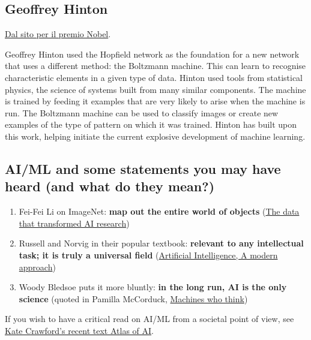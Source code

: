 \documentclass[%
oneside,                 %
final,                   %
10pt]{article}
\begin{document}
\subsection{Geoffrey Hinton}

\href{{https://www.nobelprize.org/prizes/physics/2024/press-release/#:~:text=Geoffrey%20Hinton%20invented%20a%20method,learning%20using%20artificial%20neural%20networks}}{Dal sito per il premio Nobel}.
\begin{block}{}
Geoffrey Hinton used the Hopfield network as the foundation for a new
network that uses a different method: the Boltzmann machine. This can
learn to recognise characteristic elements in a given type of
data. Hinton used tools from statistical physics, the science of
systems built from many similar components. The machine is trained by
feeding it examples that are very likely to arise when the machine is
run. The Boltzmann machine can be used to classify images or create
new examples of the type of pattern on which it was trained. Hinton
has built upon this work, helping initiate the current explosive
development of machine learning.
\end{block}

\subsection{AI/ML and some statements you may have heard (and what do they mean?)}

\begin{enumerate}
\item Fei-Fei Li on ImageNet: \textbf{map out the entire world of objects} (\href{{https://cacm.acm.org/news/219702-the-data-that-transformed-ai-research-and-possibly-the-world/fulltext}}{The data that transformed AI research})

\item Russell and Norvig in their popular textbook: \textbf{relevant to any intellectual task; it is truly a universal field} (\href{{http://aima.cs.berkeley.edu/}}{Artificial Intelligence, A modern approach})

\item Woody Bledsoe puts it more bluntly: \textbf{in the long run, AI is the only science} (quoted in Pamilla McCorduck, \href{{https://www.pamelamccorduck.com/machines-who-think}}{Machines who think})
\end{enumerate}

\noindent
If you wish to have a critical read on AI/ML from a societal point of view, see \href{{https://www.katecrawford.net/}}{Kate Crawford's recent text Atlas of AI}. 
\end{document}
